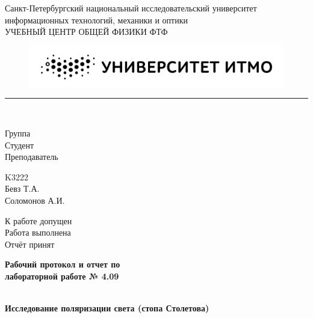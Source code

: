\documentclass{article}
\begin{document}
\begin{minipage}{0.62\textwidth}
    \begin{center}
        Санкт-Петербургский национальный исследовательский университет \\
        информационных технологий, механики и оптики \\
        УЧЕБНЫЙ ЦЕНТР ОБЩЕЙ ФИЗИКИ ФТФ
    \end{center}
\end{minipage}
\hfill
\begin{minipage}{0.38\textwidth}
    \centering
    \begin{figure}[H]
    \includegraphics[width=\textwidth]{logo.png}
    \end{figure}
\end{minipage}

\rule{\textwidth}{1pt} \\

\begin{minipage}{0.16\textwidth}
        Группа \hrulefill\\
        Студент \hrulefill\\
        Преподаватель \hrulefill
\end{minipage}%
\begin{minipage}{0.25\textwidth}
        K3222\hrulefill\\
        Бевз Т.А.\hrulefill\\
        Соломонов А.И.\hrulefill
\end{minipage}
\hfill
\begin{minipage}{0.47\textwidth}
        К работе допущен \hrulefill\\
        Работа выполнена \hrulefill\\
        Отчёт принят \hrulefill
\end{minipage}
\begin{center}
    \textbf{\huge Рабочий протокол и отчет по \\
    лабораторной работе № 4.09}
\end{center}
\begin{minipage}{1\textwidth}
        \hrulefill\\
        \Large\textbf{Исследование поляризации света (стопа Столетова)}\hrulefill
\end{minipage}
\end{document}
